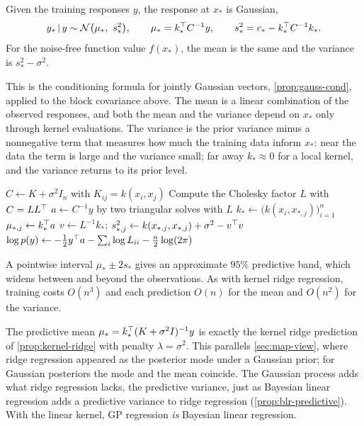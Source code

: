 \begin{proposition}\label{prop:gp-predictive}
Given the training responses $y$, the response at $x_*$ is Gaussian,
\[
y_*\given y\sim\cN\big(\mu_*,\ s_*^2\big),\qquad\mu_*=k_*\T C^{-1}y,\qquad s_*^2=c_*-k_*\T C^{-1}k_*.
\]
For the noise-free function value $f(x_*)$, the mean is the same and the variance is $s_*^2-\sigma^2$.
\end{proposition}

This is the conditioning formula for jointly Gaussian vectors, \cref{prop:gauss-cond}, applied to the block covariance above. The mean is a linear combination of the observed responses, and both the mean and the variance depend on $x_*$ only through kernel evaluations. The variance is the prior variance minus a nonnegative term that measures how much the training data inform $x_*$: near the data the term is large and the variance small; far away $k_*\approx0$ for a local kernel, and the variance returns to its prior level.

\begin{algorithm}[H]
\caption{Gaussian Process Regression}\label{alg:gp-regression}
\begin{algorithmic}[1]
\State $C\gets K+\sigma^2I_n$ with $K_{ij}=k(x_i,x_j)$
\State Compute the Cholesky factor $L$ with $C=LL^{\top}$ 
\State $a\gets C^{-1}y$ by two triangular solves with $L$
  \State $k_*\gets\big(k(x_i,x_{*,j})\big)_{i=1}^n$
  \State $\mu_{*,j}\gets k_*^{\top} a$ 
  \State $v\gets L^{-1}k_*$; \quad $s^2_{*,j}\gets k(x_{*,j},x_{*,j})+\sigma^2-v^{\top} v$ 
\EndFor
\State $\log p(y)\gets-\frac12y^{\top} a-\sum_i\log L_{ii}-\frac n2\log(2\pi)$ 
\end{algorithmic}
\end{algorithm}

A pointwise interval $\mu_*\pm2s_*$ gives an approximate $95\%$ predictive band, which widens between and beyond the observations. As with kernel ridge regression, training costs $O(n^3)$ and each prediction $O(n)$ for the mean and $O(n^2)$ for the variance.

\begin{remark}\label{rem:gp-krr}
The predictive mean $\mu_*=k_*^{\top}(K+\sigma^2I)^{-1}y$ is exactly the kernel ridge prediction of \cref{prop:kernel-ridge} with penalty $\lambda=\sigma^2$. This parallels \cref{sec:map-view}, where ridge regression appeared as the posterior mode under a Gaussian prior; for Gaussian posteriors the mode and the mean coincide. The Gaussian process adds what ridge regression lacks, the predictive variance, just as Bayesian linear regression adds a predictive variance to ridge regression (\cref{prop:blr-predictive}). With the linear kernel, GP regression \emph{is} Bayesian linear regression.
\end{remark}

